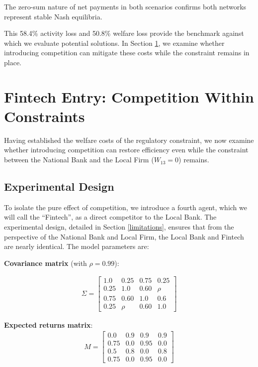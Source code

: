 The zero-sum nature of net payments in both scenarios confirms both networks represent stable Nash equilibria.

This 58.4\% activity loss and 50.8\% welfare loss provide the benchmark against which we evaluate potential solutions. In Section \ref{sec:fintech}, we examine whether introducing competition can mitigate these costs while the constraint remains in place.


\section{Fintech Entry: Competition Within Constraints}
\label{sec:fintech}

Having established the welfare costs of the regulatory constraint, we now examine whether introducing competition can restore efficiency even while the constraint between the National Bank and the Local Firm ($W_{13}=0$) remains.

\subsection{Experimental Design}

To isolate the pure effect of competition, we introduce a fourth agent, which we will call the  ``Fintech'', as a direct competitor to the Local Bank. The experimental design, detailed in Section \ref{limitations}, ensures that from the perspective of the National Bank and Local Firm, the Local Bank and Fintech are nearly identical. 
The model parameters are:

\vspace{10pt} 

\textbf{Covariance matrix} (with $\rho = 0.99$):

\begin{align} \label{eq:cov_mat_4}
\Sigma =
\begin{bmatrix}
    1.0  & 0.25 & 0.75 & 0.25 \\
    0.25 & 1.0  & 0.60 & \rho \\
    0.75 & 0.60 & 1.0  & 0.6  \\
    0.25 & \rho  & 0.60 & 1.0
\end{bmatrix}
\end{align}

\textbf{Expected returns matrix}:
\begin{align} \label{eq:mean_mat_4}
M =
\begin{bmatrix}
    0.0  & 0.9  & 0.9  & 0.9  \\
    0.75 & 0.0  & 0.95 & 0.0  \\
    0.5  & 0.8  & 0.0  & 0.8  \\
    0.75 & 0.0  & 0.95 & 0.0
\end{bmatrix}
\end{align}

